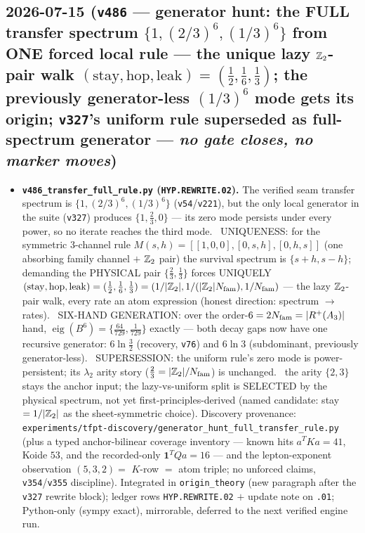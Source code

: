 \subsection*{2026-07-15 (\texttt{v486} --- generator hunt: the FULL transfer spectrum $\{1,(2/3)^6,(1/3)^6\}$ from ONE forced local rule --- the unique lazy $\mathbb{Z}_2$-pair walk $(\mathrm{stay},\mathrm{hop},\mathrm{leak})=(\tfrac12,\tfrac16,\tfrac13)$; the previously generator-less $(1/3)^6$ mode gets its origin; \texttt{v327}'s uniform rule superseded as full-spectrum generator --- \emph{no gate closes, no marker moves})}
\begin{itemize}[leftmargin=1.5em]
\item \textbf{\texttt{v486\_transfer\_full\_rule.py} (\texttt{HYP.REWRITE.02}).} The verified seam
transfer spectrum is $\{1,(2/3)^6,(1/3)^6\}$ (\texttt{v54}/\texttt{v221}), but the only local generator
in the suite (\texttt{v327}) produces $\{1,\tfrac23,0\}$ --- its zero mode persists under every power, so
no iterate reaches the third mode. \mE\ UNIQUENESS: for the symmetric $3$-channel rule
$M(s,h)=[[1,0,0],[0,s,h],[0,h,s]]$ (one absorbing family channel $+$ $\mathbb{Z}_2$ pair) the survival spectrum
is $\{s{+}h,s{-}h\}$; demanding the PHYSICAL pair $\{\tfrac23,\tfrac13\}$ forces UNIQUELY
$(\mathrm{stay},\mathrm{hop},\mathrm{leak})=(\tfrac12,\tfrac16,\tfrac13)=(1/|\mathbb{Z}_2|,1/(|\mathbb{Z}_2|N_{\mathrm{fam}}),
1/N_{\mathrm{fam}})$ --- the lazy $\mathbb{Z}_2$-pair walk, every rate an atom expression (honest direction: spectrum $\to$
rates). \mE\ SIX-HAND GENERATION: over the order-$6=2N_{\mathrm{fam}}=|R^+(A_3)|$ hand,
$\operatorname{eig}(B^6)=\{\tfrac{64}{729},\tfrac1{729}\}$ exactly --- both decay gaps now have one
recursive generator: $6\ln\tfrac32$ (recovery, \texttt{v76}) and $6\ln3$ (subdominant, previously
generator-less). \mE\ SUPERSESSION: the uniform rule's zero mode is power-persistent; its $\lambda_2$
arity story ($\tfrac23=|\mathbb{Z}_2|/N_{\mathrm{fam}}$) is unchanged. \mO\ the arity $\{2,3\}$ stays the anchor input; the
lazy-vs-uniform split is SELECTED by the physical spectrum, not yet first-principles-derived (named
candidate: stay $=1/|\mathbb{Z}_2|$ as the sheet-symmetric choice). Discovery provenance:
\texttt{experiments/tfpt-discovery/generator\_hunt\_full\_transfer\_rule.py} (plus a typed
anchor-bilinear coverage inventory --- known hits $a^TKa{=}41$, Koide $53$, and the recorded-only
$\mathbf1^TQa{=}16$ --- and the lepton-exponent observation $(5,3,2)=$ $K$-row $=$ atom triple; no
unforced claims, \texttt{v354}/\texttt{v355} discipline). Integrated in \texttt{origin\_theory} (new
paragraph after the \texttt{v327} rewrite block); ledger rows \texttt{HYP.REWRITE.02} $+$ update note on
\texttt{.01}; Python-only (sympy exact), mirrorable, deferred to the next verified engine run.
\end{itemize}

